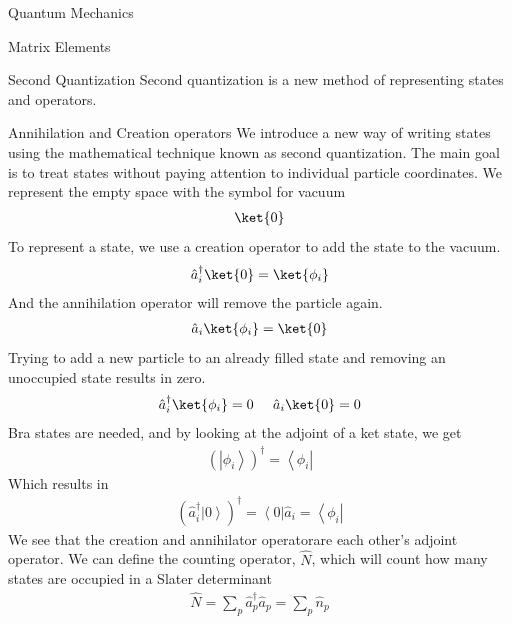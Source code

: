 \documentclass[twoside,english]{uiofysmaster}
\begin{document}
\begin{chapter}{Quantum Mechanics}
	\begin{section}{Matrix Elements}
		
	\end{section}

\end{chapter}





\begin{chapter}{Second Quantization}
 	Second quantization is a new method of representing states and operators. 
	\begin{section}{Annihilation and Creation operators}
		We introduce a new way of writing states using the mathematical technique known as second quantization. The main goal is to treat states without paying attention
		to individual particle coordinates. We represent the empty space with the symbol for vacuum
		\begin{align}
			\ket{0}
		\end{align}
		To represent a state, we use a creation operator to add the state to the vacuum.
		\begin{align}
			\hat a_i^{\dagger} \ket{0} = \ket{\phi_i}
		\end{align}
		And the annihilation operator will remove the particle again. 
		\begin{align}
			\hat a_i \ket{\phi_i} = \ket{0}
		\end{align}
		Trying to add a new particle to an already filled state and removing an unoccupied state results in zero.
		\begin{align}
			\hat a_i^{\dagger} \ket{\phi_i} = 0 \;\;\;\;\; \hat a_i \ket{0} = 0
		\end{align}
		Bra states are needed, and by looking at the adjoint of a ket state, we get
		\begin{align}
			\left(\left| \phi_i \right> \right)^\dagger = \left< \phi_i \right| 
		\end{align}
		Which results in
		\begin{align}
			\left( \hat a_i^\dagger \left| 0 \right> \right)^\dagger = \left< 0 \right| \hat a_i = \left< \phi_i \right|
		\end{align}
		We see that the creation and annihilator operatorare each other's adjoint operator. We can define the counting operator, $\hat N$, which will count how many states are occupied in a Slater determinant
		\begin{align}
			\hat N = \sum_p \hat a^\dagger_p \hat a_p = \sum_p \hat n_p
		\end{align}
	\end{section}


\end{chapter}
\end{document}
